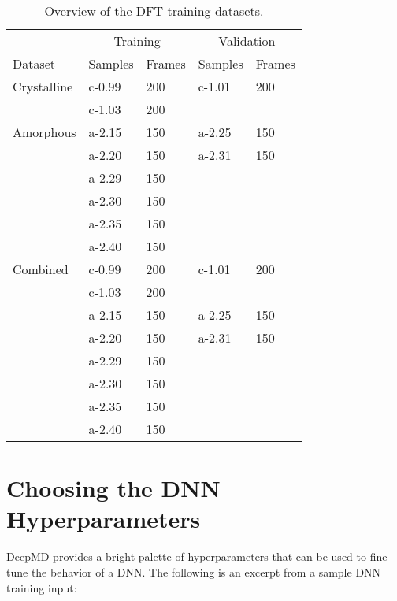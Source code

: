\begin{table}
  \begin{tabularx}{\textwidth}{lllll}
    \toprule
    \multicolumn{1}{c}{} & \multicolumn{2}{c}{Training} & \multicolumn{2}{c}{Validation} \\
    Dataset & Samples & Frames & Samples & Frames \\
    \midrule
    Crystalline & c-0.99 & 200 & c-1.01 & 200 \\
     & c-1.03 & 200 & & \\
    \midrule
    Amorphous & a-2.15 & 150 & a-2.25 & 150 \\
     & a-2.20 & 150 & a-2.31 & 150 \\
     & a-2.29 & 150 & & \\
     & a-2.30 & 150 & & \\
     & a-2.35 & 150 & & \\
     & a-2.40 & 150 & & \\
    \midrule
    Combined & c-0.99 & 200 & c-1.01 & 200 \\
     & c-1.03 & 200 & & \\
     & a-2.15 & 150 & a-2.25 & 150 \\
     & a-2.20 & 150 & a-2.31 & 150 \\
     & a-2.29 & 150 & & \\
     & a-2.30 & 150 & & \\
     & a-2.35 & 150 & & \\
     & a-2.40 & 150 & & \\
    \bottomrule
  \end{tabularx}
  \caption{Overview of the DFT training datasets.}
  \label{tab:datasets}
\end{table}

\section{Choosing the DNN Hyperparameters}

DeepMD provides a bright palette of hyperparameters that can be used to
fine-tune the behavior of a DNN. The following is an excerpt from a sample DNN
training input:

